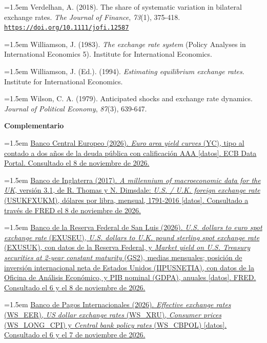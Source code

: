 \documentclass[10pt,a4paper]{article}
\begin{document}
\noindent\hangindent=1.5em Verdelhan, A. (2018). The share of systematic variation in bilateral exchange rates. \textit{The Journal of Finance}, \textit{73}(1), 375-418. \href{https://doi.org/10.1111/jofi.12587}{\nolinkurl{https://doi.org/10.1111/jofi.12587}}

\noindent\hangindent=1.5em Williamson, J. (1983). \textit{The exchange rate system} (Policy Analyses in International Economics 5). Institute for International Economics.

\noindent\hangindent=1.5em Williamson, J. (Ed.). (1994). \textit{Estimating equilibrium exchange rates}. Institute for International Economics.

\noindent\hangindent=1.5em Wilson, C. A. (1979). Anticipated shocks and exchange rate dynamics. \textit{Journal of Political Economy}, \textit{87}(3), 639-647.

\textbf{Complementario}

\noindent\hangindent=1.5em \href{https://data.ecb.europa.eu/data/datasets/YC}{Banco Central Europeo (2026). \textit{Euro area yield curves} (YC), tipo al contado a dos años de la deuda pública con calificación AAA [datos]. ECB Data Portal. Consultado el 8 de noviembre de 2026.}

\noindent\hangindent=1.5em \href{https://fred.stlouisfed.org/series/USUKFXUKM}{Banco de Inglaterra (2017). \textit{A millennium of macroeconomic data for the UK}, versión 3.1, de R. Thomas y N. Dimsdale: \textit{U.S. / U.K. foreign exchange rate} (USUKFXUKM), dólares por libra, mensual, 1791-2016 [datos]. Consultado a través de FRED el 8 de noviembre de 2026.}

\noindent\hangindent=1.5em \href{https://fred.stlouisfed.org/series/EXUSEU}{Banco de la Reserva Federal de San Luis (2026). \textit{U.S. dollars to euro spot exchange rate} (EXUSEU), \textit{U.S. dollars to U.K. pound sterling spot exchange rate} (EXUSUK), con datos de la Reserva Federal, y \textit{Market yield on U.S. Treasury securities at 2-year constant maturity} (GS2), medias mensuales; posición de inversión internacional neta de Estados Unidos (IIPUSNETIA), con datos de la Oficina de Análisis Económico, y PIB nominal (GDPA), anuales [datos]. FRED. Consultado el 6 y el 8 de noviembre de 2026.}

\noindent\hangindent=1.5em \href{https://data.bis.org/topics/EER}{Banco de Pagos Internacionales (2026). \textit{Effective exchange rates} (WS\_EER), \textit{US dollar exchange rates} (WS\_XRU), \textit{Consumer prices} (WS\_LONG\_CPI) y \textit{Central bank policy rates} (WS\_CBPOL) [datos]. Consultado el 6 y el 7 de noviembre de 2026.}
\end{document}
